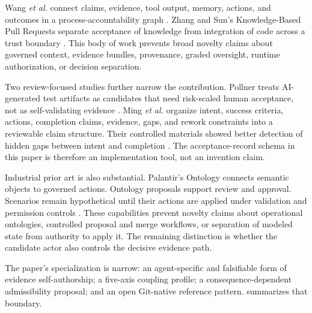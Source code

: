 \documentclass[11pt]{article}
\newcommand{\etal}{\textit{et al.}}
\begin{document}
Wang \etal{} connect claims, evidence, tool output, memory, actions, and outcomes in a process-accountability graph \citep{wang2026traces}. Zhang and Sun's Knowledge-Based Pull Requests separate acceptance of knowledge from integration of code across a trust boundary \citep{zhang2026kpr}. This body of work prevents broad novelty claims about governed context, evidence bundles, provenance, graded oversight, runtime authorization, or decision separation.

Two review-focused studies further narrow the contribution. Pollner treats AI-generated test artifacts as candidates that need risk-scaled human acceptance, not as self-validating evidence \citep{pollner2026oversight}. Ming \etal{} organize intent, success criteria, actions, completion claims, evidence, gaps, and rework constraints into a reviewable claim structure. Their controlled materials showed better detection of hidden gaps between intent and completion \citep{ming2026reviewability}. The acceptance-record schema in this paper is therefore an implementation tool, not an invention claim.

Industrial prior art is also substantial. Palantir's Ontology connects semantic objects to governed actions. Ontology proposals support review and approval. Scenarios remain hypothetical until their actions are applied under validation and permission controls \citep{palantir2026ontology,palantir2026proposals,palantir2026scenarios}. These capabilities prevent novelty claims about operational ontologies, controlled proposal and merge workflows, or separation of modeled state from authority to apply it. The remaining distinction is whether the candidate actor also controls the decisive evidence path.

The paper's specialization is narrow: an agent-specific and falsifiable form of evidence self-authorship; a five-axis coupling profile; a consequence-dependent admissibility proposal; and an open Git-native reference pattern.  summarizes that boundary.
\end{document}
